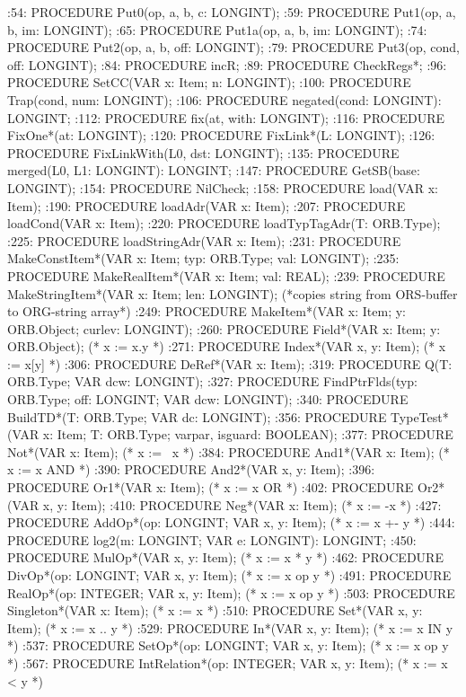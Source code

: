 :54:  PROCEDURE Put0(op, a, b, c: LONGINT);
:59:  PROCEDURE Put1(op, a, b, im: LONGINT);
:65:  PROCEDURE Put1a(op, a, b, im: LONGINT);
:74:  PROCEDURE Put2(op, a, b, off: LONGINT);
:79:  PROCEDURE Put3(op, cond, off: LONGINT);
:84:  PROCEDURE incR;
:89:  PROCEDURE CheckRegs*;
:96:  PROCEDURE SetCC(VAR x: Item; n: LONGINT);
:100:  PROCEDURE Trap(cond, num: LONGINT);
:106:  PROCEDURE negated(cond: LONGINT): LONGINT;
:112:  PROCEDURE fix(at, with: LONGINT);
:116:  PROCEDURE FixOne*(at: LONGINT);
:120:  PROCEDURE FixLink*(L: LONGINT);
:126:  PROCEDURE FixLinkWith(L0, dst: LONGINT);
:135:  PROCEDURE merged(L0, L1: LONGINT): LONGINT;
:147:  PROCEDURE GetSB(base: LONGINT);
:154:  PROCEDURE NilCheck;
:158:  PROCEDURE load(VAR x: Item);
:190:  PROCEDURE loadAdr(VAR x: Item);
:207:  PROCEDURE loadCond(VAR x: Item);
:220:  PROCEDURE loadTypTagAdr(T: ORB.Type);
:225:  PROCEDURE loadStringAdr(VAR x: Item);
:231:  PROCEDURE MakeConstItem*(VAR x: Item; typ: ORB.Type; val: LONGINT);
:235:  PROCEDURE MakeRealItem*(VAR x: Item; val: REAL);
:239:  PROCEDURE MakeStringItem*(VAR x: Item; len: LONGINT); (*copies string from ORS-buffer to ORG-string array*)
:249:  PROCEDURE MakeItem*(VAR x: Item; y: ORB.Object; curlev: LONGINT);
:260:  PROCEDURE Field*(VAR x: Item; y: ORB.Object);   (* x := x.y *)
:271:  PROCEDURE Index*(VAR x, y: Item);   (* x := x[y] *)
:306:  PROCEDURE DeRef*(VAR x: Item);
:319:  PROCEDURE Q(T: ORB.Type; VAR dcw: LONGINT);
:327:  PROCEDURE FindPtrFlds(typ: ORB.Type; off: LONGINT; VAR dcw: LONGINT);
:340:  PROCEDURE BuildTD*(T: ORB.Type; VAR dc: LONGINT);
:356:  PROCEDURE TypeTest*(VAR x: Item; T: ORB.Type; varpar, isguard: BOOLEAN);
:377:  PROCEDURE Not*(VAR x: Item);   (* x := ~x *)
:384:  PROCEDURE And1*(VAR x: Item);   (* x := x AND *)
:390:  PROCEDURE And2*(VAR x, y: Item);
:396:  PROCEDURE Or1*(VAR x: Item);   (* x := x OR *)
:402:  PROCEDURE Or2*(VAR x, y: Item);
:410:  PROCEDURE Neg*(VAR x: Item);   (* x := -x *)
:427:  PROCEDURE AddOp*(op: LONGINT; VAR x, y: Item);   (* x := x +- y *)
:444:  PROCEDURE log2(m: LONGINT; VAR e: LONGINT): LONGINT;
:450:  PROCEDURE MulOp*(VAR x, y: Item);   (* x := x * y *)
:462:  PROCEDURE DivOp*(op: LONGINT; VAR x, y: Item);   (* x := x op y *)
:491:  PROCEDURE RealOp*(op: INTEGER; VAR x, y: Item);   (* x := x op y *)
:503:  PROCEDURE Singleton*(VAR x: Item);  (* x := {x} *)
:510:  PROCEDURE Set*(VAR x, y: Item);   (* x := {x .. y} *)
:529:  PROCEDURE In*(VAR x, y: Item);  (* x := x IN y *)
:537:  PROCEDURE SetOp*(op: LONGINT; VAR x, y: Item);   (* x := x op y *)
:567:  PROCEDURE IntRelation*(op: INTEGER; VAR x, y: Item);   (* x := x < y *)
